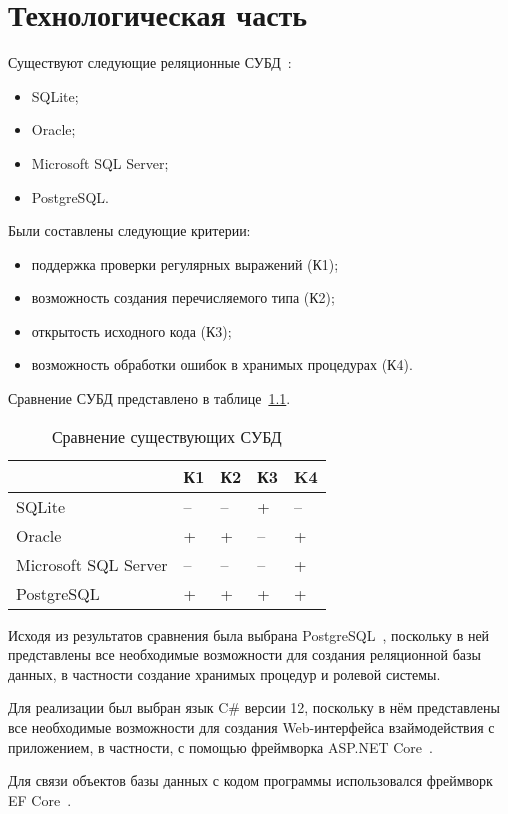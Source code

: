 \chapter{Технологическая часть}

Существуют следующие реляционные СУБД~\cite{dbanalyse}:
\begin{itemize}
	\item SQLite;
	\item Oracle;
	\item Microsoft SQL Server;
	\item PostgreSQL. 
\end{itemize}
Были составлены следующие критерии:
\begin{itemize}
	\item поддержка проверки регулярных выражений (К1);
	\item возможность создания перечисляемого типа (К2);
	\item открытость исходного кода (К3);
	\item возможность обработки ошибок в хранимых процедурах (К4).
\end{itemize}
Сравнение СУБД представлено в таблице~\ref{tbl:dbms_compr}. 
\begin{table}[h!]
	\centering
	\caption{\label{tbl:dbms_compr}Сравнение существующих СУБД}
	\begin{tabular}{|l|l|l|l|l|}
		\hline
		& К1 & К2 & К3 & K4\\\hline
		SQLite & -- & -- & + & --\\\hline
	 	Oracle & + & + & -- & + \\\hline
		Microsoft SQL Server & -- & -- & -- & +\\\hline
		PostgreSQL & + & + & + & + \\\hline
	\end{tabular}
\end{table}

Исходя из результатов сравнения была выбрана PostgreSQL~\cite{postgresql}, поскольку в ней представлены все необходимые возможности для создания реляционной базы данных, в частности создание хранимых процедур и ролевой системы.

Для реализации был выбран язык C\# версии 12, поскольку в нём представлены все необходимые возможности для создания Web-интерфейса взаймодействия с приложением, в частности, с помощью фреймворка ASP.NET Core~\cite{aspnet}.

Для связи объектов базы данных с кодом программы использовался фреймворк EF Core~\cite{efcore}.

